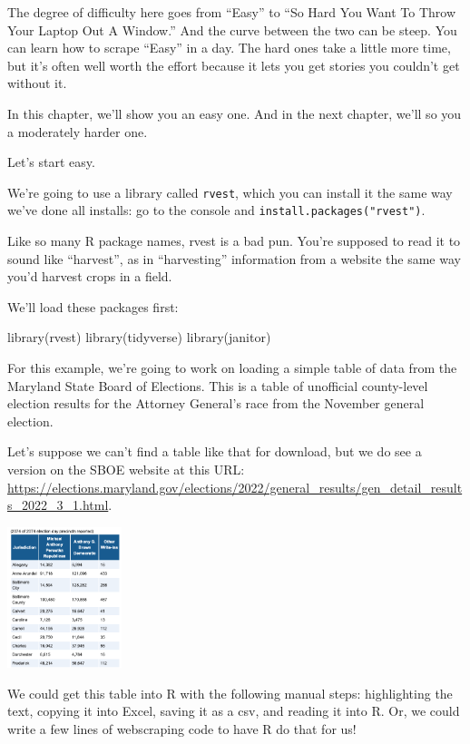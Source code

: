 \documentclass[
  letterpaper,
  DIV=11,
  numbers=noendperiod]{scrreprt}
\newenvironment{Shaded}{\begin{snugshade}}{\end{snugshade}}
\newcommand{\FunctionTok}[1]{\textcolor[rgb]{0.28,0.35,0.67}{#1}}
\newcommand{\NormalTok}[1]{\textcolor[rgb]{0.00,0.23,0.31}{#1}}
\begin{document}
The degree of difficulty here goes from ``Easy'' to ``So Hard You Want
To Throw Your Laptop Out A Window.'' And the curve between the two can
be steep. You can learn how to scrape ``Easy'' in a day. The hard ones
take a little more time, but it's often well worth the effort because it
lets you get stories you couldn't get without it.

In this chapter, we'll show you an easy one. And in the next chapter,
we'll so you a moderately harder one.

Let's start easy.

We're going to use a library called \texttt{rvest}, which you can
install it the same way we've done all installs: go to the console and
\texttt{install.packages("rvest")}.

Like so many R package names, rvest is a bad pun. You're supposed to
read it to sound like ``harvest'', as in ``harvesting'' information from
a website the same way you'd harvest crops in a field.

We'll load these packages first:

\begin{Shaded}
\begin{Highlighting}[]
\FunctionTok{library}\NormalTok{(rvest)}
\FunctionTok{library}\NormalTok{(tidyverse)}
\FunctionTok{library}\NormalTok{(janitor)}
\end{Highlighting}
\end{Shaded}

For this example, we're going to work on loading a simple table of data
from the Maryland State Board of Elections. This is a table of
unofficial county-level election results for the Attorney General's race
from the November general election.

Let's suppose we can't find a table like that for download, but we do
see a version on the SBOE website at this URL:
\url{https://elections.maryland.gov/elections/2022/general_results/gen_detail_results_2022_3_1.html}.

\includegraphics[width=1.31in,height=\textheight]{./images/rvest1.png}

We could get this table into R with the following manual steps:
highlighting the text, copying it into Excel, saving it as a csv, and
reading it into R. Or, we could write a few lines of webscraping code to
have R do that for us!
\end{document}
